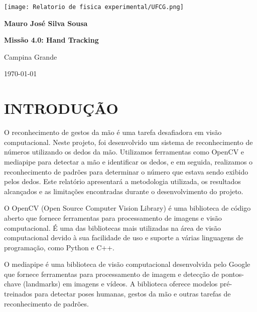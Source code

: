 \documentclass[12pt,a4paper]{article}
\begin{document}
    \onehalfspacing
    \thispagestyle{empty}
    
    \begin{center}
        \texttt{[image: Relatorio de fisica experimental/UFCG.png]}

        \vspace{4cm}

        \textbf{Mauro José Silva Sousa}
    \end{center}
        
    
    \vspace{4cm}
    
    \begin{center}
        \textbf{\Huge Missão 4.0: Hand Tracking}
    \end{center}

    \vspace{8cm}
    \begin{center}
        Campina Grande

        \today
    \end{center}
    \newpage
    \tableofcontents
    \thispagestyle{empty}
    \newpage

    \pagestyle{headings}
    \section*{INTRODUÇÃO}

        O reconhecimento de gestos da mão é uma tarefa desafiadora em visão computacional. Neste projeto, foi desenvolvido um sistema de reconhecimento de números utilizando os dedos da mão. Utilizamos ferramentas como OpenCV e mediapipe para detectar a mão e identificar os dedos, e em seguida, realizamos o reconhecimento de padrões para determinar o número que estava sendo exibido pelos dedos. Este relatório apresentará a metodologia utilizada, os resultados alcançados e as limitações encontradas durante o desenvolvimento do projeto.

        O OpenCV (Open Source Computer Vision Library) é uma biblioteca de código aberto que fornece ferramentas para processamento de imagens e visão computacional. É uma das bibliotecas mais utilizadas na área de visão computacional devido à sua facilidade de uso e suporte a várias linguagens de programação, como Python e C++. 

        O mediapipe é uma biblioteca de visão computacional desenvolvida pelo Google que fornece ferramentas para processamento de imagem e detecção de pontos-chave (landmarks) em imagens e vídeos. A biblioteca oferece modelos pré-treinados para detectar poses humanas, gestos da mão e outras tarefas de reconhecimento de padrões.
    
\end{document}

